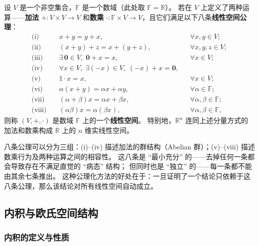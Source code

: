 \documentclass[lang=cn,11pt]{elegantbook}
\begin{document}
\begin{definition} \label{def:linear-space}
设 $V$ 是一个非空集合，$\mathbb F$ 是一个数域（此处取 $\mathbb F=\mathbb R$）。
若在 $V$ 上定义了两种运算——\textbf{加法} $+:V\times V\to V$ 和\textbf{数乘} $\cdot:\mathbb F\times V\to V$，且它们满足以下八条\textbf{线性空间公理}：
\begin{align}
  \text{(i)}&\quad x+y=y+x,                               &&\forall x,y\in V;         \tag{L1}\\
  \text{(ii)}&\quad (x+y)+z=x+(y+z),                       &&\forall x,y,z\in V;       \tag{L2}\\
  \text{(iii)}&\quad \exists\,\boldsymbol 0\in V,\;\boldsymbol 0+x=x, &&\forall x\in V;          \tag{L3}\\
  \text{(iv)}&\quad \forall x\in V,\;\exists (-x)\in V,\;(-x)+x=\boldsymbol 0,              && \tag{L4}\\
  \text{(v)}&\quad 1\cdot x=x,                               &&\forall x\in V;           \tag{L5}\\
  \text{(vi)}&\quad \alpha(x+y)=\alpha x+\alpha y,          &&\forall\alpha\in\mathbb F; \tag{L6}\\
  \text{(vii)}&\quad (\alpha+\beta)x=\alpha x+\beta x,        &&\forall\alpha,\beta\in\mathbb F; \tag{L7}\\
  \text{(viii)}&\quad (\alpha\beta)x=\alpha(\beta x),          &&\forall\alpha,\beta\in\mathbb F, \tag{L8}
\end{align}
则称 $(V,+,\cdot)$ 是数域 $\mathbb F$ 上的一个\textbf{线性空间}。
特别地，$\mathbb R^n$ 连同上述分量方式的加法和数乘构成 $\mathbb R$ 上的 $n$ 维实线性空间。
\end{definition}

\begin{remark}[关于公理体系的说明]
八条公理可以分为三组：(i)--(iv) 描述加法的群结构（Abelian 群）；(v)--(viii) 描述数乘行为及两种运算之间的相容性。
这八条是 ``最小充分'' 的——去掉任何一条都会导致存在不满足直觉的 ``病态'' 结构；
但同时也是 ``独立'' 的——每一条都不能由其余七条推出。
这种公理化方法的好处在于：一旦证明了一个结论只依赖于这八条公理，那么该结论对所有线性空间自动成立。
\end{remark}


\subsection{内积与欧氏空间结构}

\subsubsection{内积的定义与性质}
\end{document}
